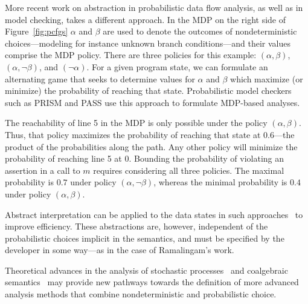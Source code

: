 More recent work on abstraction in probabilistic data flow
analysis, as well as in model checking, takes a different approach.
In the MDP on the right side of Figure~\ref{fig:pcfgs} $\alpha$ and
$\beta$ are used to denote the outcomes of nondeterministic
choices---modeling for instance unknown branch conditions---and their
values comprise the MDP policy.
There are three policies for this example:
$(\alpha,\beta)$, $(\alpha,\neg \beta)$, and $(\neg \alpha)$.
For a given program state, we can formulate an alternating game
that seeks to determine values for $\alpha$ and $\beta$ which 
maximize (or minimize) the probability of reaching that state.
Probabilistic model checkers such as PRISM and PASS 
use this approach to formulate MDP-based analyses.

The reachability of line 5 in the MDP is only possible under
the policy $(\alpha, \beta)$.  Thus, that policy maximizes the
probability of reaching that state at $0.6$---the product of 
the probabilities along the path. 
Any other policy will minimize the probability of reaching
line 5 at $0$.
Bounding the probability of violating an assertion in a call to $m$ 
requires considering all three policies.  The
maximal probability is $0.7$ under policy $(\alpha, \neg \beta)$,
whereas the minimal probability is 
$0.4$ under policy $(\alpha, \beta)$.

Abstract interpretation can be applied to the data states in
such approaches~\cite{kwiatkowska2011prism,wachter2010best,esparza2011probabilistic}
to improve efficiency.  These abstractions are, however,
independent of the probabilistic choices implicit in the semantics, and must be specified
by the developer in some way---as in the case of Ramalingam's work.

Theoretical advances in the analysis of stochastic 
processes~\cite{Puggelli:CAV2013} and coalgebraic 
semantics~\cite{HASUO200647,Oliveira2016449}
may provide new pathways towards the definition of more advanced 
analysis methods that combine nondeterministic 
and probabilistic choice.
